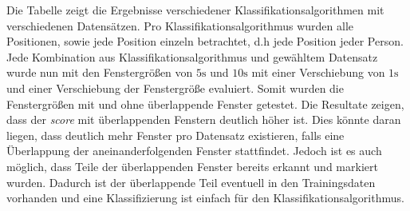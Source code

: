 Die Tabelle zeigt die Ergebnisse verschiedener Klassifikationsalgorithmen mit verschiedenen Datensätzen.
Pro Klassifikationsalgorithmus wurden alle Positionen, sowie jede Position einzeln betrachtet, d.h jede Position jeder Person.
Jede Kombination aus Klassifikationsalgorithmus und gewähltem Datensatz wurde nun mit den Fenstergrößen von $5\si{\s}$ und $10\si{\s}$ mit einer Verschiebung von $1\si{\s}$ und einer Verschiebung der Fenstergröße evaluiert.
Somit wurden die Fenstergrößen mit und ohne überlappende Fenster getestet.
Die Resultate zeigen, dass der \textit{score} mit überlappenden Fenstern deutlich höher ist.
Dies könnte daran liegen, dass deutlich mehr Fenster pro Datensatz existieren, falls eine Überlappung der aneinanderfolgenden Fenster stattfindet.
Jedoch ist es auch möglich, dass Teile der überlappenden Fenster bereits erkannt und markiert wurden.
Dadurch ist der überlappende Teil eventuell in den Trainingsdaten vorhanden und eine Klassifizierung ist einfach für den Klassifikationsalgorithmus.

